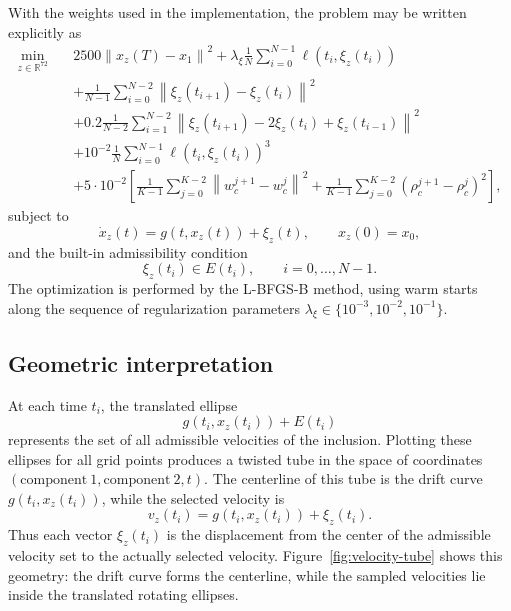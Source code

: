 \documentclass[11pt]{article}
\theoremstyle{definition}
\theoremstyle{remark}
\newcommand{\R}{\mathbb{R}}
\newcommand{\norm}[1]{\left\lVert #1\right\rVert}
\begin{document}
With the weights used in the implementation, the problem may be written explicitly as
\begin{align}
\min_{z\in\R^{72}}\quad
&2500\norm{x_z(T)-x_1}^2
+\lambda_{\xi}\frac{1}{N}\sum_{i=0}^{N-1}\ell(t_i,\xi_z(t_i))
\nonumber\\
&+\frac{1}{N-1}\sum_{i=0}^{N-2}\norm{\xi_z(t_{i+1})-\xi_z(t_i)}^2
\nonumber\\
&+0.2\frac{1}{N-2}\sum_{i=1}^{N-2}
\norm{\xi_z(t_{i+1})-2\xi_z(t_i)+\xi_z(t_{i-1})}^2
\nonumber\\
&+10^{-2}\frac{1}{N}\sum_{i=0}^{N-1}\ell(t_i,\xi_z(t_i))^3
\nonumber\\
&+5\cdot 10^{-2}
\left[
\frac{1}{K-1}\sum_{j=0}^{K-2}\norm{w_c^{j+1}-w_c^j}^2
+
\frac{1}{K-1}\sum_{j=0}^{K-2}(\rho_c^{j+1}-\rho_c^j)^2
\right],
\label{eq:explicit-optimization}
\end{align}
subject to
\begin{equation}
    \dot{x}_z(t)=g(t,x_z(t))+\xi_z(t), \qquad x_z(0)=x_0,
    \label{eq:optimization-dynamics}
\end{equation}
and the built-in admissibility condition
\begin{equation}
    \xi_z(t_i)\in E(t_i), \qquad i=0,\ldots,N-1.
    \label{eq:built-in-admissibility}
\end{equation}
The optimization is performed by the L-BFGS-B method, using warm starts along the sequence of regularization parameters $\lambda_{\xi}\in\{10^{-3},10^{-2},10^{-1}\}$.

\subsection{Geometric interpretation}

At each time $t_i$, the translated ellipse
\begin{equation}
    g(t_i,x_z(t_i))+E(t_i)
\end{equation}
represents the set of all admissible velocities of the inclusion. Plotting these ellipses for all grid points produces a twisted tube in the space of coordinates $(\mathrm{component\ }1,\mathrm{component\ }2,t)$. The centerline of this tube is the drift curve $g(t_i,x_z(t_i))$, while the selected velocity is
\begin{equation}
    v_z(t_i)=g(t_i,x_z(t_i))+\xi_z(t_i).
\end{equation}
Thus each vector $\xi_z(t_i)$ is the displacement from the center of the admissible velocity set to the actually selected velocity. Figure~\ref{fig:velocity-tube} shows this geometry: the drift curve forms the centerline, while the sampled velocities lie inside the translated rotating ellipses.
\end{document}
